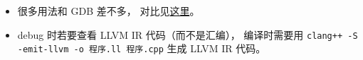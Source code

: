 
\begin{issues}
\issueDraft
\end{issues}


\begin{itemize}
\item 很多用法和 GDB 差不多， 对比见\href{https://lldb.llvm.org/use/map.html}{这里}。
\item debug 时若要查看 LLVM IR 代码（而不是汇编）， 编译时需要用 \verb|clang++ -S -emit-llvm -o 程序.ll 程序.cpp| 生成 LLVM IR 代码。
\end{itemize}
